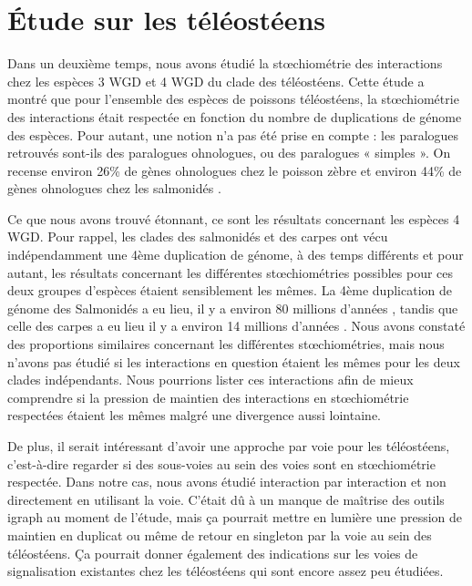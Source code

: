 \section{Étude sur les téléostéens}
\par Dans un deuxième temps, nous avons étudié la stœchiométrie des interactions chez les espèces 3 WGD et 4 WGD du clade des téléostéens. Cette étude a montré que pour l’ensemble des espèces de poissons téléostéens, la stœchiométrie des interactions était respectée en fonction du nombre de duplications de génome des espèces. Pour autant, une notion n’a pas été prise en compte : les paralogues retrouvés sont-ils des paralogues ohnologues, ou des paralogues « simples ». On recense environ 26\% de gènes ohnologues chez le poisson zèbre \parencite{howe_zebrafish_2013} et environ 44\% de gènes ohnologues chez les salmonidés \parencite{dimos_homology_2023}.
\par Ce que nous avons trouvé étonnant, ce sont les résultats concernant les espèces 4 WGD. Pour rappel, les clades des salmonidés et des carpes ont vécu indépendamment une 4ème duplication de génome, à des temps différents et pour autant, les résultats concernant les différentes stœchiométries possibles pour ces deux groupes d’espèces étaient sensiblement les mêmes. La 4ème duplication de génome des Salmonidés a eu lieu, il y a environ 80 millions d’années \parencite{lien_atlantic_2016}, tandis que celle des carpes a eu lieu il y a environ 14 millions d’années \parencite{jaillon_genome_2004, kon_single-cell_2022, xu_allotetraploid_2019}. Nous avons constaté des proportions similaires concernant les différentes stœchiométries, mais nous n’avons pas étudié si les interactions en question étaient les mêmes pour les deux clades indépendants. Nous pourrions lister ces interactions afin de mieux comprendre si la pression de maintien des interactions en stœchiométrie respectées étaient les mêmes malgré une divergence aussi lointaine. 
\par De plus, il serait intéressant d’avoir une approche par voie pour les téléostéens, c’est-à-dire regarder si des sous-voies au sein des voies sont en stœchiométrie respectée. Dans notre cas, nous avons étudié interaction par interaction et non directement en utilisant la voie. C’était dû à un manque de maîtrise des outils igraph au moment de l’étude, mais ça pourrait mettre en lumière une pression de maintien en duplicat ou même de retour en singleton par la voie au sein des téléostéens. Ça pourrait donner également des indications sur les voies de signalisation existantes chez les téléostéens qui sont encore assez peu étudiées. 

